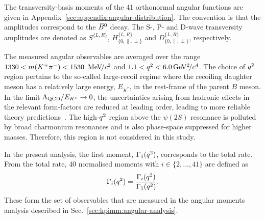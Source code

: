 The transversity-basis moments of the 41 orthonormal angular functions are given in Appendix~\ref{sec:appendix:angular-distribution}. The convention is that the amplitudes correspond to the $\Bzb$ decay. The S-, P- and D-wave transversity amplitudes are denoted as $S^{\{L,R\}}$, $H^{\{L,R\}}_{\{0,\parallel,\perp\}}$ and $D^{\{L,R\}}_{\{0,\parallel,\perp\}}$, respectively. 

The measured angular observables are averaged over the range $1330<\mkpi<1530~\mevcc$ and $1.1<\qsq<6.0\gevgevcccc$. The choice of $\qsq$ region pertains to the so-called large-recoil regime where the recoiling daughter meson has a relatively large energy, $E_{K^\ast}$, in the rest-frame of the parent $B$ meson. In the limit $\Lambda_{\rm QCD}/E_{K^\ast} \to 0$, the uncertainties arising from hadronic effects in the relevant form-factors are reduced at leading order, leading to more reliable theory predictions~\cite{DescotesGenon:2013wba}. The high-$\qsq$ region above the $\psi(2S)$ resonance is polluted by broad charmonium resonances and is also phase-space suppressed for higher \mkpi masses. Therefore, this region is not considered in this study.

In the present analysis, the first moment, $\Gamma_{1}(\qsq)$, corresponds to the total rate. From the total rate, 40 normalised moments with $i \in \{2,...,41\}$ are defined as
\begin{equation}
\label{eqn:norm_mom_def}
\overline{\Gamma}_i(\qsq) = \frac{\Gamma_{i}(\qsq)}{\Gamma_{1}(\qsq)}.
\end{equation}
\noindent These form the set of observables that are measured in the angular moments analysis described in Sec.~\ref{sec:kpimm:angular-analysis}.